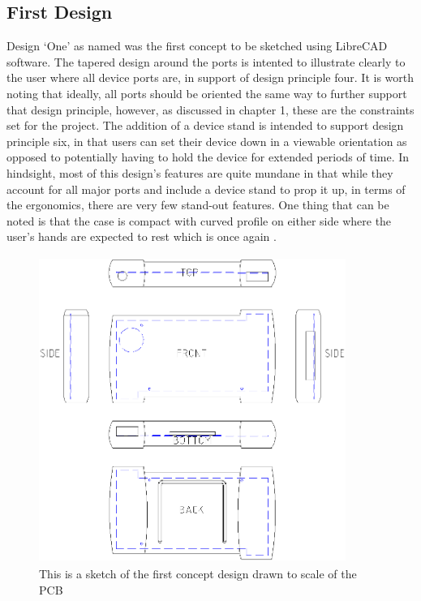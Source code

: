 \subsection{First Design}


Design ‘One’ as named was the first concept to be sketched using LibreCAD software.
The tapered design around the ports is intented to illustrate clearly to the user where all device ports are, in support of design principle four. 
It is worth noting that ideally, all ports should be oriented the same way to further support that design principle, however, as discussed in chapter 1, these are the constraints set for the project.
The addition of a device stand is intended to support design principle six, in that users can set their device down in a viewable orientation as opposed to potentially having to hold the device for extended periods of time.
In hindsight, most of this design’s features are quite mundane in that while they account for all major ports and include a device stand to prop it up, in terms of the ergonomics, there are very few stand-out features. 
One thing that can be noted is that the case is compact with curved profile on either side where the user’s hands are expected to rest which is once again .

\begin{figure}[hbt!]
\centering
\includegraphics[width=10cm,height=10cm,keepaspectratio]{Figures/design1_sketch.png}
\caption{This is a sketch of the first concept design drawn to scale of the PCB}
\label{fig:Design_1}
\end{figure}


